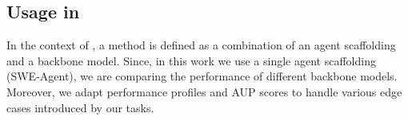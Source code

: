%




\subsection{Usage in \mlgym}
\label{sec:aup_in_mlgym}

In the context of \mlgym, a method is defined as a combination of an agent scaffolding and a backbone model.
%
Since, in this work we use a single agent scaffolding (SWE-Agent), we are comparing the performance of different backbone models.
%
Moreover, we adapt performance profiles and AUP scores to handle various edge cases introduced by our \mlgym tasks.
%

